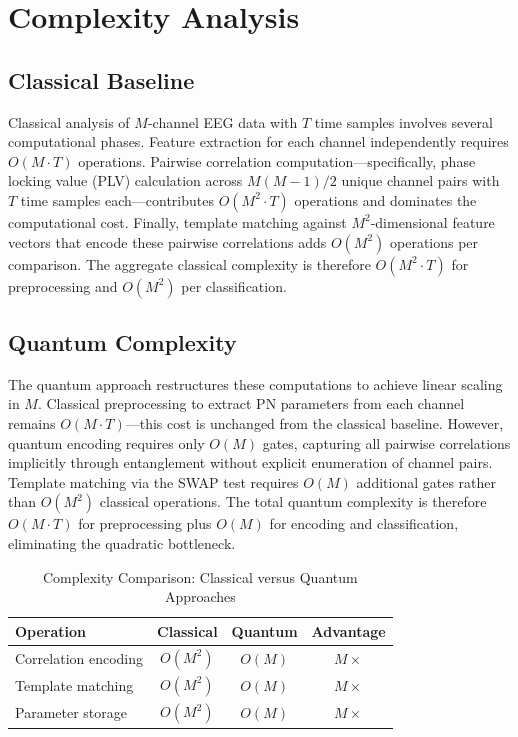 \documentclass[pdflatex,sn-mathphys-num]{sn-jnl}
\begin{document}
\section{Complexity Analysis}
\label{sec:complexity}

\subsection{Classical Baseline}
\label{sec:classical-complexity}

Classical analysis of $M$-channel EEG data with $T$ time samples involves several computational phases. Feature extraction for each channel independently requires $O(M \cdot T)$ operations. Pairwise correlation computation---specifically, phase locking value (PLV) calculation across $M(M-1)/2$ unique channel pairs with $T$ time samples each---contributes $O(M^2 \cdot T)$ operations and dominates the computational cost. Finally, template matching against $M^2$-dimensional feature vectors that encode these pairwise correlations adds $O(M^2)$ operations per comparison. The aggregate classical complexity is therefore $O(M^2 \cdot T)$ for preprocessing and $O(M^2)$ per classification.

\subsection{Quantum Complexity}
\label{sec:quantum-complexity}

The quantum approach restructures these computations to achieve linear scaling in $M$. Classical preprocessing to extract PN parameters from each channel remains $O(M \cdot T)$---this cost is unchanged from the classical baseline. However, quantum encoding requires only $O(M)$ gates, capturing all pairwise correlations implicitly through entanglement without explicit enumeration of channel pairs. Template matching via the SWAP test \cite{buhrman2001} requires $O(M)$ additional gates rather than $O(M^2)$ classical operations. The total quantum complexity is therefore $O(M \cdot T)$ for preprocessing plus $O(M)$ for encoding and classification, eliminating the quadratic bottleneck.

\begin{table}[htbp]
\centering
\caption{Complexity Comparison: Classical versus Quantum Approaches}
\label{tab:complexity}
\begin{tabular}{lccc}
\toprule
Operation & Classical & Quantum & Advantage \\
\midrule
Correlation encoding & $O(M^2)$ & $O(M)$ & $M\times$ \\
Template matching & $O(M^2)$ & $O(M)$ & $M\times$ \\
Parameter storage & $O(M^2)$ & $O(M)$ & $M\times$ \\
\bottomrule
\end{tabular}
\end{table}
\end{document}
